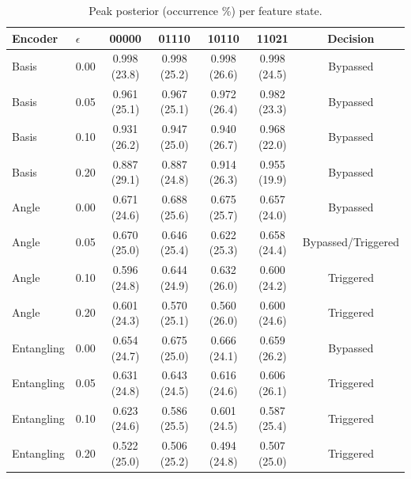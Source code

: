 \begin{table}[htbp]
\centering
\small
\caption{Peak posterior (occurrence \%) per feature state.}
\label{tab:S2}
\begin{tabular}{llccccc}
\toprule
Encoder & $\epsilon$ & 00000 & 01110 & 10110 & 11021 & Decision \\
\midrule
Basis & 0.00 & 0.998 (23.8) & 0.998 (25.2) & 0.998 (26.6) & 0.998 (24.5) & Bypassed \\
Basis & 0.05 & 0.961 (25.1) & 0.967 (25.1) & 0.972 (26.4) & 0.982 (23.3) & Bypassed \\
Basis & 0.10 & 0.931 (26.2) & 0.947 (25.0) & 0.940 (26.7) & 0.968 (22.0) & Bypassed \\
Basis & 0.20 & 0.887 (29.1) & 0.887 (24.8) & 0.914 (26.3) & 0.955 (19.9) & Bypassed \\
\midrule
Angle & 0.00 & 0.671 (24.6) & 0.688 (25.6) & 0.675 (25.7) & 0.657 (24.0) & Bypassed \\
Angle & 0.05 & 0.670 (25.0) & 0.646 (25.4) & 0.622 (25.3) & 0.658 (24.4) & Bypassed/Triggered \\
Angle & 0.10 & 0.596 (24.8) & 0.644 (24.9) & 0.632 (26.0) & 0.600 (24.2) & Triggered \\
Angle & 0.20 & 0.601 (24.3) & 0.570 (25.1) & 0.560 (26.0) & 0.600 (24.6) & Triggered \\
\midrule
Entangling & 0.00 & 0.654 (24.7) & 0.675 (25.0) & 0.666 (24.1) & 0.659 (26.2) & Bypassed \\
Entangling & 0.05 & 0.631 (24.8) & 0.643 (24.5) & 0.616 (24.6) & 0.606 (26.1) & Triggered \\
Entangling & 0.10 & 0.623 (24.6) & 0.586 (25.5) & 0.601 (24.5) & 0.587 (25.4) & Triggered \\
Entangling & 0.20 & 0.522 (25.0) & 0.506 (25.2) & 0.494 (24.8) & 0.507 (25.0) & Triggered \\
\bottomrule
\end{tabular}
\end{table}
